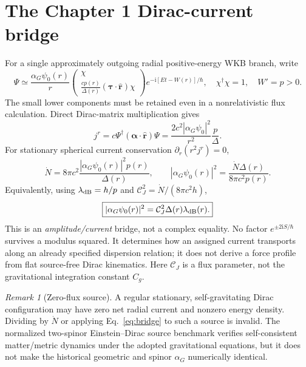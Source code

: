 \documentclass[11pt,a4paper]{article}
\theoremstyle{remark}
\newtheorem{remark}[theorem]{Remark}
\newcommand{\ii}{\mathrm i}
\newcommand{\eref}[1]{Eq.~\eqref{#1}}
\begin{document}
\section{The Chapter 1 Dirac-current bridge}\label{sec:bridge}
For a single approximately outgoing radial positive-energy WKB branch, write
\begin{equation}\label{eq:wkbspinor}
 \Psi\simeq\frac{\alpha_G\psi_0(r)}{r}
 \begin{pmatrix}\chi\\ \displaystyle\frac{cp(r)}{\Delta(r)}(\bm\tau\cdot\hat{\bm r})\chi\end{pmatrix}
 e^{-\ii[Et-W(r)]/\hbar},\quad \chi^\dagger\chi=1,\quad W'=p>0.
\end{equation}
The small lower components must be retained even in a nonrelativistic flux calculation. Direct Dirac-matrix multiplication gives
\begin{equation}\label{eq:current}
 j^r=c\Psi^\dagger(\bm\alpha\cdot\hat{\bm r})\Psi
=\frac{2c^2|\alpha_G\psi_0|^2}{r^2}\frac p\Delta.
\end{equation}
For stationary spherical current conservation $\partial_r(r^2j^r)=0$,
\begin{equation}\label{eq:flux}
\boxed{\dot N=8\pi c^2\frac{|\alpha_G\psi_0(r)|^2p(r)}{\Delta(r)},\qquad
 |\alpha_G\psi_0(r)|^2=\frac{\dot N\Delta(r)}{8\pi c^2p(r)}.}
\end{equation}
Equivalently, using $\lambda_{\rm dB}=h/p$ and $\mathcal C_J^2=\dot N/(8\pi c^2h)$,
\begin{equation}\label{eq:bridge}
 \boxed{|\alpha_G\psi_0(r)|^2=\mathcal C_J^2\Delta(r)\lambda_{\rm dB}(r).}
\end{equation}
This is an \emph{amplitude/current} bridge, not a complex equality. No factor $e^{\pm2\ii S/\hbar}$ survives a modulus squared. It determines how an assigned current transports along an already specified dispersion relation; it does not derive a force profile from flat source-free Dirac kinematics. Here $\mathcal C_J$ is a flux parameter, not the gravitational integration constant $C_g$.

\begin{remark}[Zero-flux source]
A regular stationary, self-gravitating Dirac configuration may have zero net radial current and nonzero energy density. Dividing by $\dot N$ or applying \eref{eq:bridge} to such a source is invalid. The normalized two-spinor Einstein--Dirac source benchmark verifies self-consistent matter/metric dynamics under the adopted gravitational equations, but it does not make the historical geometric and spinor $\alpha_G$ numerically identical.
\end{remark}
\end{document}
